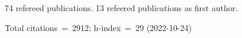 74 refereed publications. 13 refeered publications as first author.

Total citations~=~2912; h-index~=~29 (2022-10-24)